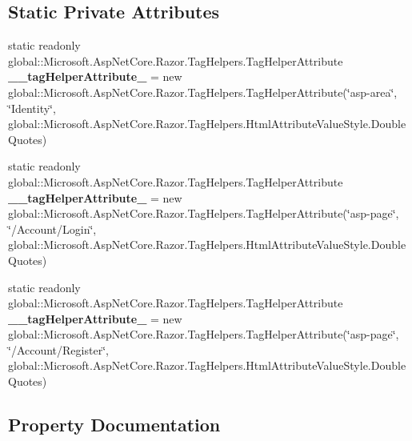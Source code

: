 \subsection*{Static Private Attributes}
\begin{DoxyCompactItemize}
\item 
\mbox{\label{class_asp_net_core_1_1_views___shared_____login_partial_a3be8ceb578765b762789673e020a3312}} 
static readonly global\+::\+Microsoft.\+Asp\+Net\+Core.\+Razor.\+Tag\+Helpers.\+Tag\+Helper\+Attribute {\bfseries \+\_\+\+\_\+tag\+Helper\+Attribute\+\_} = new global\+::\+Microsoft.\+Asp\+Net\+Core.\+Razor.\+Tag\+Helpers.\+Tag\+Helper\+Attribute(\char`\"{}asp-\/area\char`\"{}, \char`\"{}Identity\char`\"{}, global\+::\+Microsoft.\+Asp\+Net\+Core.\+Razor.\+Tag\+Helpers.\+Html\+Attribute\+Value\+Style.\+Double\+Quotes)
\item 
\mbox{\label{class_asp_net_core_1_1_views___shared_____login_partial_a1a22560ad9d382075fbaa413642fbe70}} 
static readonly global\+::\+Microsoft.\+Asp\+Net\+Core.\+Razor.\+Tag\+Helpers.\+Tag\+Helper\+Attribute {\bfseries \+\_\+\+\_\+tag\+Helper\+Attribute\+\_} = new global\+::\+Microsoft.\+Asp\+Net\+Core.\+Razor.\+Tag\+Helpers.\+Tag\+Helper\+Attribute(\char`\"{}asp-\/page\char`\"{}, \char`\"{}/Account/Login\char`\"{}, global\+::\+Microsoft.\+Asp\+Net\+Core.\+Razor.\+Tag\+Helpers.\+Html\+Attribute\+Value\+Style.\+Double\+Quotes)
\item 
\mbox{\label{class_asp_net_core_1_1_views___shared_____login_partial_abcc82ed44221e94181486bd4cc980dba}} 
static readonly global\+::\+Microsoft.\+Asp\+Net\+Core.\+Razor.\+Tag\+Helpers.\+Tag\+Helper\+Attribute {\bfseries \+\_\+\+\_\+tag\+Helper\+Attribute\+\_} = new global\+::\+Microsoft.\+Asp\+Net\+Core.\+Razor.\+Tag\+Helpers.\+Tag\+Helper\+Attribute(\char`\"{}asp-\/page\char`\"{}, \char`\"{}/Account/Register\char`\"{}, global\+::\+Microsoft.\+Asp\+Net\+Core.\+Razor.\+Tag\+Helpers.\+Html\+Attribute\+Value\+Style.\+Double\+Quotes)
\end{DoxyCompactItemize}


\subsection{Property Documentation}
\mbox{\label{class_asp_net_core_1_1_views___shared_____login_partial_a41b4c7f1dd36b41b14cd0de31ecd24f7}} 
